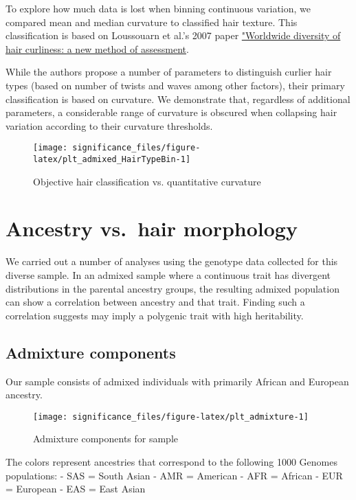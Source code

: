 \documentclass[
]{article}
\begin{document}
To explore how much data is lost when binning continuous variation, we
compared mean and median curvature to classified hair texture. This
classification is based on Loussouarn et al.'s 2007 paper
\href{https://doi.org/10.1111/j.1365-4632.2007.03453.x}{"Worldwide
diversity of hair curliness: a new method of assessment}.

While the authors propose a number of parameters to distinguish curlier
hair types (based on number of twists and waves among other factors),
their primary classification is based on curvature. We demonstrate that,
regardless of additional parameters, a considerable range of curvature
is obscured when collapsing hair variation according to their curvature
thresholds.

\begin{figure}
\texttt{[image: significance\_files/figure-latex/plt\_admixed\_HairTypeBin-1]} \caption{Objective hair classification vs. quantitative curvature}\label{fig:plt_admixed_HairTypeBin}
\end{figure}

\hypertarget{ancestry-vs.-hair-morphology}{%
\section{Ancestry vs.~hair
morphology}\label{ancestry-vs.-hair-morphology}}

We carried out a number of analyses using the genotype data collected
for this diverse sample. In an admixed sample where a continuous trait
has divergent distributions in the parental ancestry groups, the
resulting admixed population can show a correlation between ancestry and
that trait. Finding such a correlation suggests may imply a polygenic
trait with high heritability.

\hypertarget{admixture-components}{%
\subsection{Admixture components}\label{admixture-components}}

Our sample consists of admixed individuals with primarily African and
European ancestry.

\begin{figure}
\texttt{[image: significance\_files/figure-latex/plt\_admixture-1]} \caption{Admixture components for sample}\label{fig:plt_admixture}
\end{figure}

The colors represent ancestries that correspond to the following 1000
Genomes populations: - SAS = South Asian - AMR = American - AFR =
African - EUR = European - EAS = East Asian
\end{document}
